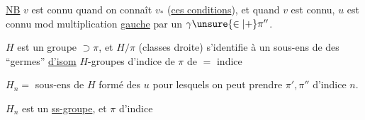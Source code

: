 \uline{NB} $v$ est connu quand on connaît $v_*$ (\uline{ces conditions}), et quand $v$ est connu, $u$ est connu  mod multiplication \uline{ gauche} par un $\gamma\unsure{\in|+}\pi''$.


$H$ est un groupe $\supset\pi$, et $H/\pi$ (classes  droite) s'identifie à un sous-ens de  des ``germes'' \uline{d'isom}  $H$-groupes d'indice  de $\pi$ de $=$ indice

$H_n=$ sous-ens de $H$ formé des $u$ pour lesquels on peut prendre $\pi',\pi''$ d'indice $n$.

$H_n$ est un \uline{ss-groupe}, et $\pi$ d'indice
